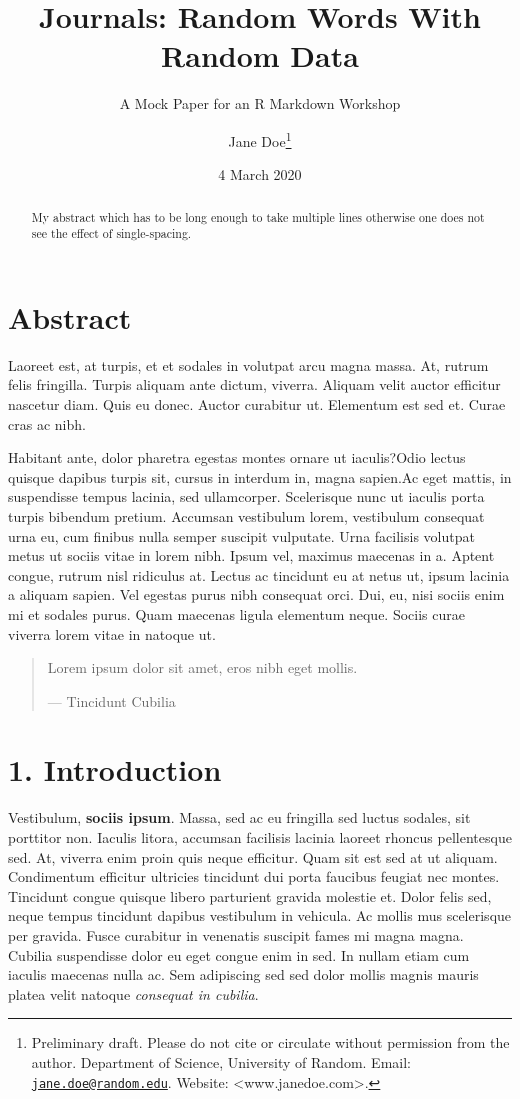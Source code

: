 \documentclass[
]{article}
\title{Journals: Random Words With Random Data}
\subtitle{A Mock Paper for an R Markdown Workshop}
\author{Jane Doe\footnote{Preliminary draft. Please do not cite or
  circulate without permission from the author. Department of Science,
  University of Random. Email:
  \href{mailto:jane.doe@random.edu}{\nolinkurl{jane.doe@random.edu}}.
  Website: \textless www.janedoe.com\textgreater.}}
\date{4 March 2020}
\begin{document}
\maketitle
\begin{abstract}
\singlespacing My abstract which has to be long enough to take multiple
lines otherwise one does not see the effect of single-spacing.
\end{abstract}

\hypertarget{abstract}{%
\section{Abstract}\label{abstract}}

Laoreet est, at turpis, et et sodales in volutpat arcu magna massa. At,
rutrum felis fringilla. Turpis aliquam ante dictum, viverra. Aliquam
velit auctor efficitur nascetur diam. Quis eu donec. Auctor curabitur
ut. Elementum est sed et. Curae cras ac nibh.

Habitant ante, dolor pharetra egestas montes ornare ut iaculis?Odio
lectus quisque dapibus turpis sit, cursus in interdum in, magna
sapien.Ac eget mattis, in suspendisse tempus lacinia, sed ullamcorper.
Scelerisque nunc ut iaculis porta turpis bibendum pretium. Accumsan
vestibulum lorem, vestibulum consequat urna eu, cum finibus nulla semper
suscipit vulputate. Urna facilisis volutpat metus ut sociis vitae in
lorem nibh. Ipsum vel, maximus maecenas in a. Aptent congue, rutrum nisl
ridiculus at. Lectus ac tincidunt eu at netus ut, ipsum lacinia a
aliquam sapien. Vel egestas purus nibh consequat orci. Dui, eu, nisi
sociis enim mi et sodales purus. Quam maecenas ligula elementum neque.
Sociis curae viverra lorem vitae in natoque ut.

\begin{quote}
Lorem ipsum dolor sit amet, eros nibh eget mollis.

--- Tincidunt Cubilia
\end{quote}

\hypertarget{introduction}{%
\section{1. Introduction}\label{introduction}}

Vestibulum, \textbf{sociis ipsum}. Massa, sed ac eu fringilla sed luctus
sodales, sit porttitor non. Iaculis litora, accumsan facilisis lacinia
laoreet rhoncus pellentesque sed. At, viverra enim proin quis neque
efficitur. Quam sit est sed at ut aliquam. Condimentum efficitur
ultricies tincidunt dui porta faucibus feugiat nec montes. Tincidunt
congue quisque libero parturient gravida molestie et. Dolor felis sed,
neque tempus tincidunt dapibus vestibulum in vehicula. Ac mollis mus
scelerisque per gravida. Fusce curabitur in venenatis suscipit fames mi
magna magna. Cubilia suspendisse dolor eu eget congue enim in sed. In
nullam etiam cum iaculis maecenas nulla ac. Sem adipiscing sed sed dolor
mollis magnis mauris platea velit natoque \emph{consequat in cubilia}.
\end{document}
